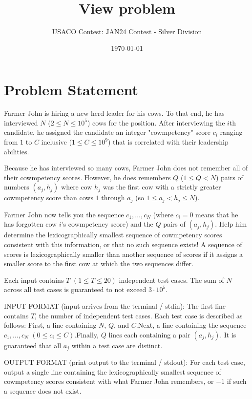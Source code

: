 \documentclass[12pt]{article}
\title{View problem}
\author{USACO Contest: JAN24 Contest - Silver Division}
\date{\today}
\begin{document}
\maketitle

\section*{Problem Statement}


Farmer John is hiring a new herd leader for his cows. To that end, he has
interviewed $N$ ($2 \leq N \leq 10^5$) cows for the position. After interviewing
the $i$th candidate, he assigned the candidate an integer "cowmpetency" score
$c_i$ ranging from $1$ to $C$ inclusive ($1 \leq C \leq 10^9$) that is
correlated with their leadership abilities.

Because he has interviewed so many cows, Farmer John does not remember all of
their cowmpetency scores. However, he does remembers $Q$ ($1 \leq Q < N$) pairs
of numbers $(a_j, h_j)$ where cow $h_j$ was the first cow with a strictly
greater cowmpetency score than cows $1$ through $a_j$ (so
$1 \leq a_j < h_j \leq N$).

Farmer John now tells you the sequence $c_1, \dots, c_N$ (where $c_i = 0$ means
that he has forgotten cow $i$'s cowmpetency score) and the $Q$ pairs of
$(a_j, h_j)$. Help him determine the lexicographically smallest sequence
of cowmpetency scores consistent with this information, or that no such sequence
exists! A sequence of scores is lexicographically smaller than another sequence
of scores if it assigns a smaller score to the first cow at which the two
sequences differ.

Each input contains $T$ $(1 \leq T \leq 20)$ independent test cases. The sum of
$N$ across all test cases is guaranteed to not exceed  $3 \cdot 10^5$. 

INPUT FORMAT (input arrives from the terminal / stdin):
The first line contains $T$, the number of independent test cases.  Each test
case is described as follows:
First, a line containing $N$, $Q$, and $C$.Next, a line containing
the sequence $c_1, \dots, c_N$ $(0 \leq c_i \leq C)$.Finally, $Q$
lines each containing a pair $(a_j, h_j)$. It is guaranteed that all $a_j$
within a test case are distinct.

OUTPUT FORMAT (print output to the terminal / stdout):
For each test case, output a single line containing the lexicographically
smallest sequence of cowmpetency scores consistent with what Farmer John remembers, or $-1$ if such a sequence does not
exist.
\end{document}
